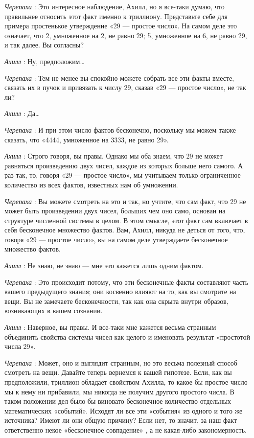 \documentclass[../main.tex]{subfiles}
\begin{document}
\begin{dialogue}
\emph{Черепаха} : Это интересное наблюдение, Ахилл, но я все-таки думаю, что правильнее относить этот факт именно к триллиону. Представьте себе для примера простенькое утверждение «29 --- простое число». На самом деле это означает, что 2, умноженное на 2, не равно 29; 5, умноженное на 6, не равно 29, и так далее. Вы согласны?

\emph{Ахилл} : Ну, предположим\ldots{}

\emph{Черепаха} : Тем не менее вы спокойно можете собрать все эти факты вместе, связать их в пучок и привязать к числу 29, сказав «29 --- простое число», не так ли?

\emph{Ахилл} : Да\ldots{}

\emph{Черепаха} : И при этом число фактов бесконечно, поскольку мы можем также сказать, что «4444, умноженное на 3333, не равно 29».

\emph{Ахилл} : Строго говоря, вы правы. Однако мы оба знаем, что 29 не может равняться произведению двух чисел, каждое из которых больше него самого. А раз так, то, говоря «29 --- простое число», мы учитываем только ограниченное количество из всех фактов, известных нам об умножении.

\emph{Черепаха} : Вы можете смотреть на это и так, но учтите, что сам факт, что 29 не может быть произведении двух чисел, больших чем оно само, основан на структуре численной системы в целом. В этом смысле, этот факт сам включает в себя бесконечное множество фактов. Вам, Ахилл, никуда не деться от того, что, говоря «29 --- простое число», вы на самом деле утверждаете бесконечное множество фактов.

\emph{Ахилл} : Не знаю, не знаю --- мне это кажется лишь одним фактом.

\emph{Черепаха} : Это происходит потому, что эти бесконечные факты составляют часть вашего предыдущего знания; они косвенно влияют на то, как вы смотрите на вещи. Вы не замечаете бесконечности, так как она скрыта внутри образов, возникающих в вашем сознании.

\emph{Ахилл} : Наверное, вы правы. И все-таки мне кажется весьма странным объединить свойства системы чисел как целого и именовать результат «простотой числа 29».

\emph{Черепаха} : Может, оно и выглядит странным, но это весьма полезный способ смотреть на вещи. Давайте теперь вернемся к вашей гипотезе. Если, как вы предположили, триллион обладает свойством Ахилла, то какое бы простое число мы к нему ни прибавили, мы никогда не получим другого простого числа. В таком положении дел было бы виновато бесконечное количество отдельных математических «событий». Исходят ли все эти «события» из одного и того же источника? Имеют ли они общую причину? Если нет, то значит, за наш факт ответственно некое «бесконечное совпадение» , а не какая-либо закономерность.


\end{dialogue}
\end{document}

